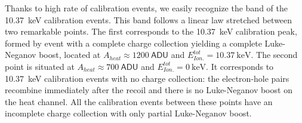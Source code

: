 Thanks to high rate of calibration events, we easily recognize the band of the \SI{10.37}{\kilo\eV} calibration events. This band follows a linear law stretched between two remarkable points. The first corresponds to the \SI{10.37}{\kilo\eV} calibration peak, formed by event with a complete charge collection yielding a complete Luke-Neganov boost, located at $A_{heat}\approx \SI{1200}{\textsf{ADU}}$ and $E_{Ion.}^{tot} = \SI{10.37}{\kilo\eV}$. The second point is situated at $A_{heat}\approx \SI{700}{\textsf{ADU}}$ and $E_{Ion.}^{tot} = \SI{0}{\kilo\eV}$. It corresponds to \SI{10.37}{\kilo\eV} calibration events with no charge collection: the electron-hole pairs recombine immediately after the recoil and there is no Luke-Neganov boost on the heat channel. All the calibration events between these points have an incomplete charge collection with only partial Luke-Neganov boost.


